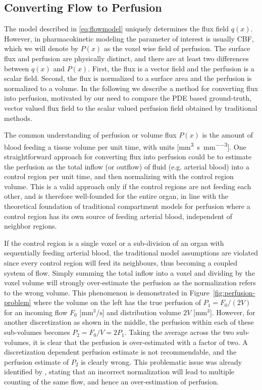 \documentclass[journal,twocolumn]{IEEEtran}
\newcommand{\Perf}{P}
\newcommand{\Flow}{F}
\newcommand{\siFmm}{\milli\meter\cubed\per\second}
\newcommand{\siQmm}{\milli\meter\cubed\per\second\per\milli\meter\cubed}
\newcommand{\simm}{\milli\meter\cubed}
\begin{document}
	\subsection{Converting Flow to Perfusion}\label{sec:flux2perf}
	The model described in \eqref{eq:flowmodel} uniquely determines the flux field $q(x)$. 
	However, in pharmacokinetic modeling the parameter of interest is usually CBF, which we will denote by $\Perf (x)$ as the voxel wise field of perfusion. The surface flux and perfusion are physically distinct, and there are at least two differences between $q(x)$ and $\Perf (x)$. 
	First, the flux is a vector field and the perfusion is a scalar field. 
	Second, the flux is normalized to a surface area and the perfusion is normalized to a volume. 
	In the following we describe a method for converting flux into perfusion, motivated by our need to compare the PDE based ground-truth, vector valued flux field to the scalar valued perfusion field obtained by traditional methods.

	The common understanding of perfusion or volume flux $\Perf (x)$ is the amount of blood feeding a tissue volume per unit time, with units [\si{\siQmm}]. 
	One straightforward approach for converting flux into perfusion could be to estimate the perfusion as the total inflow (or outflow) of fluid (e.g. arterial blood) into a control region per unit time, and then normalizing with the control region volume. 
	This is a valid approach only if the control regions are not feeding each other, and is therefore well-founded for the entire organ,
	in line with the theoretical foundation of traditional compartment models for perfusion where a control region has its own source of feeding arterial blood, independent of neighbor regions. 
	
	If the control region is a single voxel or a sub-division of an organ with sequentially feeding arterial blood, the traditional model assumptions are violated since every control region will feed its neighbours, thus becoming a coupled system of flow. 
	Simply summing the total inflow into a voxel and dividing by the voxel volume will strongly over-estimate the perfusion as the normalization refers to the wrong volume. 
	This phenomenon is demonstrated in Figure~\ref{fig:perfusion-problem} where the volume on the left has the true perfusion of $\Perf_{1} = \Flow_0 /(2V)$ for an incoming flow $\Flow_0$ [$\si{\siFmm}$] and distribution volume $2V$ [$\si{\simm}$]. 
	However, for another discretization as shown in the middle, the perfusion within each of these sub-volumes becomes $\Perf_{2} = F_0/V = 2\Perf_{1}$. 
	Taking the average across the two sub-volumes, it is clear that the perfusion is over-estimated with a factor of two. 
	A discretization dependent perfusion estimate is not recommendable, and the perfusion estimate of $\Perf_{2}$ is clearly wrong. 
	This problematic issue was already identified by \cite{Henkelman1990}, stating that an incorrect normalization will lead to multiple counting of the same flow, and hence an over-estimation of perfusion.
\end{document}
